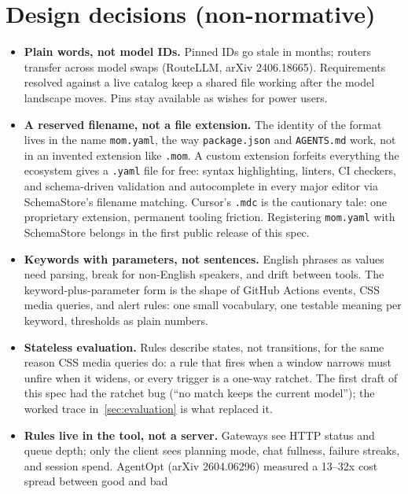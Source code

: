 \documentclass[11pt]{article}
\newcommand{\key}[1]{\texttt{#1}}
\begin{document}
\section{Design decisions (non-normative)}

\begin{itemize}
  \item \textbf{Plain words, not model IDs.} Pinned IDs go stale in months;
        routers transfer across model swaps (RouteLLM, arXiv 2406.18665).
        Requirements resolved against a live catalog keep a shared file
        working after the model landscape moves. Pins stay available as
        wishes for power users.
  \item \textbf{A reserved filename, not a file extension.} The identity of
        the format lives in the name \key{mom.yaml}, the way
        \key{package.json} and \key{AGENTS.md} work, not in an invented
        extension like \key{.mom}. A custom extension forfeits everything
        the ecosystem gives a \key{.yaml} file for free: syntax
        highlighting, linters, CI checkers, and schema-driven validation and
        autocomplete in every major editor via SchemaStore's filename
        matching. Cursor's \key{.mdc} is the cautionary tale: one
        proprietary extension, permanent tooling friction. Registering
        \key{mom.yaml} with SchemaStore belongs in the first public release
        of this spec.
  \item \textbf{Keywords with parameters, not sentences.} English phrases as
        values need parsing, break for non-English speakers, and drift
        between tools. The keyword-plus-parameter form is the shape of
        GitHub Actions events, CSS media queries, and alert rules: one small
        vocabulary, one testable meaning per keyword, thresholds as plain
        numbers.
  \item \textbf{Stateless evaluation.} Rules describe states, not
        transitions, for the same reason CSS media queries do: a rule that
        fires when a window narrows must unfire when it widens, or every
        trigger is a one-way ratchet. The first draft of this spec had the
        ratchet bug (``no match keeps the current model''); the worked trace
        in~\ref{sec:evaluation} is what replaced it.
  \item \textbf{Rules live in the tool, not a server.} Gateways see HTTP
        status and queue depth; only the client sees planning mode, chat
        fullness, failure streaks, and session spend. AgentOpt (arXiv
        2604.06296) measured a 13--32x cost spread between good and bad

\end{itemize}
\end{document}
